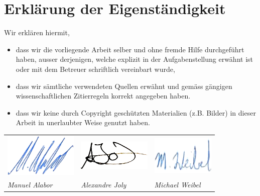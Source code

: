 \chapter*{Erklärung der Eigenständigkeit}

Wir erklären hiermit,

\begin{itemize}
	\item dass wir die vorliegende Arbeit selber und ohne fremde Hilfe durchgeführt haben, ausser derjenigen, welche explizit in der Aufgabenstellung erwähnt ist oder mit dem Betreuer schriftlich vereinbart wurde,
	\item dass wir sämtliche verwendeten Quellen erwähnt und gemäss gängigen wissenschaftlichen Zitierregeln korrekt angegeben haben.
	\item dass wir keine durch Copyright geschützten Materialien (z.B. Bilder) in dieser Arbeit in unerlaubter Weise genutzt haben.
\end{itemize}


\vspace*{3cm}

\begin{table}[H]
\begin{tabularx}{\textwidth}{X X X}
	\includegraphics[width=3.5cm]{content/images/signature-mal.png} &
	\centering\includegraphics[width=3.5cm]{content/images/signature-ajo.png} &
	\hfill\includegraphics[width=3cm]{content/images/signature-mwe.png}

	\tabularnewline

	\sffamily\textit{Manuel Alabor} &
	\centering\sffamily\textit{Alexandre Joly} &
	\hfill\sffamily\textit{Michael Weibel}
	\tabularnewline
\end{tabularx}
\end{table}